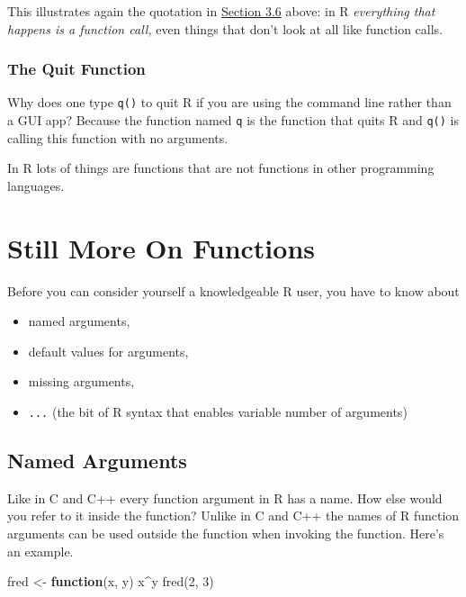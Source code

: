 \documentclass[
]{article}
\newenvironment{Shaded}{\begin{snugshade}}{\end{snugshade}}
\newcommand{\ControlFlowTok}[1]{\textcolor[rgb]{0.13,0.29,0.53}{\textbf{#1}}}
\newcommand{\DecValTok}[1]{\textcolor[rgb]{0.00,0.00,0.81}{#1}}
\newcommand{\FunctionTok}[1]{\textcolor[rgb]{0.00,0.00,0.00}{#1}}
\newcommand{\NormalTok}[1]{#1}
\newcommand{\OtherTok}[1]{\textcolor[rgb]{0.56,0.35,0.01}{#1}}
\newcommand{\SpecialCharTok}[1]{\textcolor[rgb]{0.00,0.00,0.00}{#1}}
\providecommand{\tightlist}{%
  \setlength{\itemsep}{0pt}\setlength{\parskip}{0pt}}
\begin{document}
This illustrates again the quotation in
\protect\hyperlink{objects}{Section 3.6} above: in R \emph{everything
that happens is a function call,} even things that don't look at all
like function calls.

\hypertarget{the-quit-function}{%
\subsubsection{The Quit Function}\label{the-quit-function}}

Why does one type \texttt{q()} to quit R if you are using the command
line rather than a GUI app? Because the function named \texttt{q} is the
function that quits R and \texttt{q()} is calling this function with no
arguments.

In R lots of things are functions that are not functions in other
programming languages.

\hypertarget{still-more-on-functions}{%
\section{Still More On Functions}\label{still-more-on-functions}}

Before you can consider yourself a knowledgeable R user, you have to
know about

\begin{itemize}
\tightlist
\item
  named arguments,
\item
  default values for arguments,
\item
  missing arguments,
\item
  \texttt{...} (the bit of R syntax that enables variable number of
  arguments)
\end{itemize}

\hypertarget{named-arguments}{%
\subsection{Named Arguments}\label{named-arguments}}

Like in C and C++ every function argument in R has a name. How else
would you refer to it inside the function? Unlike in C and C++ the names
of R function arguments can be used outside the function when invoking
the function. Here's an example.

\begin{Shaded}
\begin{Highlighting}[]
\NormalTok{fred }\OtherTok{\textless{}{-}} \ControlFlowTok{function}\NormalTok{(x, y) x}\SpecialCharTok{\^{}}\NormalTok{y}
\FunctionTok{fred}\NormalTok{(}\DecValTok{2}\NormalTok{, }\DecValTok{3}\NormalTok{)}
\end{Highlighting}
\end{Shaded}
\end{document}
